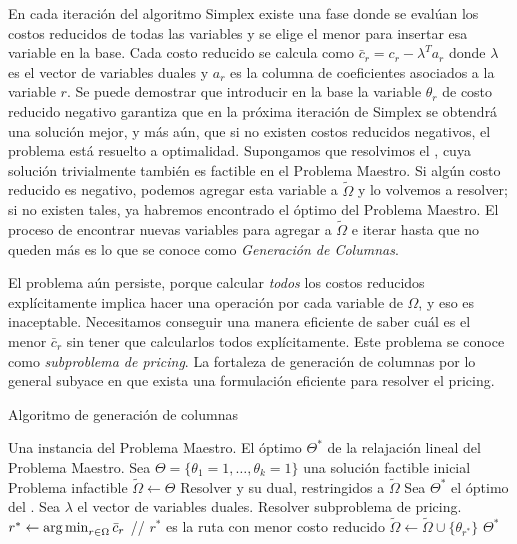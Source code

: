 En cada iteración del algoritmo Simplex existe una fase donde se evalúan los costos reducidos de todas las variables y se elige el menor para insertar esa variable en la base. Cada costo reducido se calcula como $\bar{c}_r = c_r - \lambda^{T}a_r$ donde $\lambda$ es el vector de variables duales y $a_r$ es la columna de coeficientes asociados a la variable $r$. Se puede demostrar que introducir en la base la variable $\theta_r$ de costo reducido negativo garantiza que en la próxima iteración de Simplex se obtendrá una solución mejor, y más aún, que si no existen costos reducidos negativos, el problema está resuelto a optimalidad. Supongamos que resolvimos el , cuya solución trivialmente también es factible en el Problema Maestro. Si algún costo reducido es negativo, podemos agregar esta variable a $\tilde{\Omega}$ y lo volvemos a resolver; si no existen tales, ya habremos encontrado el óptimo del Problema Maestro. El proceso de encontrar nuevas variables para agregar a $\tilde{\Omega}$ e iterar hasta que no queden más es lo que se conoce como \emph{Generación de Columnas}.

El problema aún persiste, porque calcular \emph{todos} los costos reducidos explícitamente implica hacer una operación por cada variable de $\Omega$, y eso es inaceptable. Necesitamos conseguir una manera eficiente de saber cuál es el menor $\bar{c}_r$ sin tener que calcularlos todos explícitamente. Este problema se conoce como \emph{subproblema de pricing}. La fortaleza de generación de columnas por lo general subyace en que exista una formulación eficiente para resolver el pricing.

\begin{algorithm}[H]
    \caption{Algoritmo de generación de columnas}
    \label{al:column-generation}
    \begin{algorithmic}[1]
        \Require Una instancia del Problema Maestro. 
        \Ensure El óptimo $\Theta^{*}$ de la relajación lineal del Problema Maestro. 
        \State Sea $\Theta = \{\theta_1 = 1, \dots, \theta_k = 1\}$ una solución factible inicial
        \If{$\Theta = \emptyset$}
            \Return Problema infactible
        \EndIf
        \State $\tilde{\Omega} \gets \Theta$
            \State Resolver  y su dual, restringidos a $\tilde{\Omega}$
            \State Sea $\Theta^{*}$ el óptimo del .
            \State Sea $\lambda$ el vector de variables duales.
            \State Resolver subproblema de pricing.
            \State $r^{*} \gets \operatorname*{arg\,min}_{r \in \Omega}{\bar{c}_r}$ // $r^{*}$ es la ruta con menor costo reducido
            	\Break
            \EndIf
            \State $\tilde{\Omega} \gets \tilde{\Omega} \cup \{\theta_{r^{*}}\}$
        \EndWhile
        \Return $\Theta^{*}$
    \end{algorithmic}
\end{algorithm}

